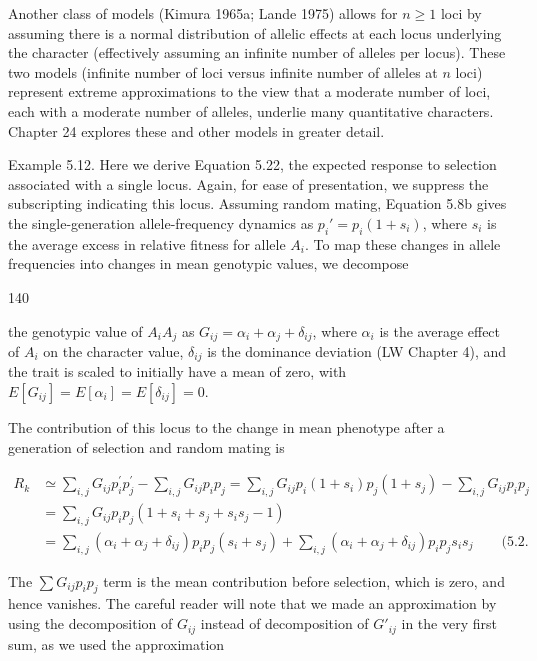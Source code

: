 \documentclass{article}
\begin{document}
Another class of models (Kimura 1965a; Lande 1975) allows for  $ n \geq 1 $ loci by assuming there is a normal distribution of allelic effects at each locus underlying the character (effectively assuming an infinite number of alleles per locus). These two models (infinite number of loci versus infinite number of alleles at  $ n $ loci) represent extreme approximations to the view that a moderate number of loci, each with a moderate number of alleles, underlie many quantitative characters. Chapter 24 explores these and other models in greater detail.

Example 5.12. Here we derive Equation 5.22, the expected response to selection associated with a single locus. Again, for ease of presentation, we suppress the subscripting indicating this locus. Assuming random mating, Equation 5.8b gives the single-generation allele-frequency dynamics as  $ p_i' = p_i(1 + s_i) $, where  $ s_i $ is the average excess in relative fitness for allele  $ A_i $. To map these changes in allele frequencies into changes in mean genotypic values, we decompose

140

the genotypic value of  $ A_i A_j $ as  $ G_{ij} = \alpha_i + \alpha_j + \delta_{ij} $, where  $ \alpha_i $ is the average effect of  $ A_i $ on the character value,  $ \delta_{ij} $ is the dominance deviation (LW Chapter 4), and the trait is scaled to initially have a mean of zero, with  $ E[G_{ij}] = E[\alpha_i] = E[\delta_{ij}] = 0 $.

The contribution of this locus to the change in mean phenotype after a generation of selection and random mating is

\begin{equation}
\begin{align*}R_{k}&\simeq\sum_{i,j}G_{ij}p_{i}^{\prime}p_{j}^{\prime}-\sum_{i,j}G_{ij}p_{i}p_{j}=\sum_{i,j}G_{ij}p_{i}(1+s_{i})p_{j}(1+s_{j})-\sum_{i,j}G_{ij}p_{i}p_{j}\\&=\sum_{i,j}G_{ij}p_{i}p_{j}(1+s_{i}+s_{j}+s_{i}s_{j}-1)\\&=\sum_{i,j}\left(\alpha_{i}+\alpha_{j}+\delta_{ij}\right)p_{i}p_{j}\left(s_{i}+s_{j}\right)+\sum_{i,j}\left(\alpha_{i}+\alpha_{j}+\delta_{ij}\right)p_{i}p_{j}s_{i}s_{j}\qquad(5.2.\end{align*}
\tag{5.24a}
\label{eq:5_24a}
\end{equation}

The  $ \sum G_{ij}p_i p_j $ term is the mean contribution before selection, which is zero, and hence vanishes. The careful reader will note that we made an approximation by using the decomposition of  $ G_{ij} $ instead of decomposition of  $ G'_{ij} $ in the very first sum, as we used the approximation
\end{document}
